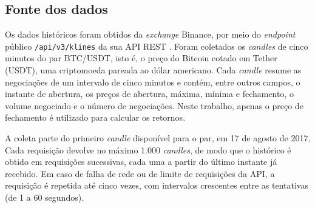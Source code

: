\documentclass[
    12pt,                %
    openright,           %
    oneside,             %
    a4paper,             %
    english,             %
    brazil               %
]{abntex2}
\begin{document}
\begin{figure}[htbp]
{
    }
\end{figure}

\subsection{Fonte dos dados}

Os dados históricos foram obtidos da \textit{exchange} Binance, por meio do \textit{endpoint} público \texttt{/api/v3/klines} 
da sua API REST \cite{BINANCE_API}. Foram coletados os \textit{candles} de cinco minutos do par BTC/USDT, isto é, o preço do Bitcoin 
cotado em Tether (USDT), uma criptomoeda pareada ao dólar americano. Cada \textit{candle} resume as negociações de um intervalo 
de cinco minutos e contém, entre outros campos, o instante de abertura, os preços de abertura, máxima, mínima e fechamento, o volume 
negociado e o número de negociações. Neste trabalho, apenas o preço de fechamento é utilizado para calcular os retornos.

A coleta parte do primeiro \textit{candle} disponível para o par, em 17 de agosto de 2017. Cada requisição devolve no máximo 1.000 \textit{candles}, 
de modo que o histórico é obtido em requisições sucessivas, cada uma a partir do último instante já recebido. Em caso de falha de rede ou 
de limite de requisições da API, a requisição é repetida até cinco vezes, com intervalos crescentes entre as tentativas (de 1 a 60 segundos).
\end{document}
